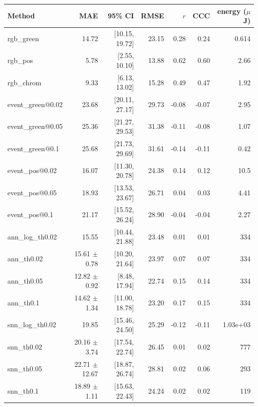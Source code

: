 \begin{tabular}{lrrrrrr}\toprule
Method & MAE & 95\% CI & RMSE & $r$ & CCC & energy ($\mu$J) \\\midrule
rgb\_green & 14.72 & [10.15, 19.72] & 23.15 & 0.28 & 0.24 & 0.614 \\
rgb\_pos & 5.78 & [2.55, 10.10] & 13.88 & 0.62 & 0.60 & 2.66 \\
rgb\_chrom & 9.33 & [6.13, 13.02] & 15.28 & 0.49 & 0.47 & 1.92 \\
event\_green@0.02 & 23.68 & [20.11, 27.17] & 29.73 & -0.08 & -0.07 & 2.95 \\
event\_green@0.05 & 25.36 & [21.27, 29.53] & 31.38 & -0.11 & -0.08 & 1.07 \\
event\_green@0.1 & 25.68 & [21.73, 29.69] & 31.61 & -0.14 & -0.11 & 0.42 \\
event\_pos@0.02 & 16.07 & [11.30, 20.78] & 24.38 & 0.14 & 0.12 & 10.5 \\
event\_pos@0.05 & 18.93 & [13.53, 23.67] & 26.71 & 0.04 & 0.03 & 4.41 \\
event\_pos@0.1 & 21.17 & [15.52, 26.24] & 28.90 & -0.04 & -0.04 & 2.27 \\
ann\_log\_th0.02 & 15.55 & [10.44, 21.88] & 23.48 & 0.01 & 0.01 & 334 \\
ann\_th0.02 & 15.61 $\pm$0.78 & [10.20, 21.64] & 23.97 & 0.07 & 0.07 & 334 \\
ann\_th0.05 & 12.82 $\pm$0.92 & [8.48, 17.94] & 22.74 & 0.15 & 0.14 & 334 \\
ann\_th0.1 & 14.62 $\pm$1.34 & [11.00, 18.78] & 23.20 & 0.17 & 0.15 & 334 \\
snn\_log\_th0.02 & 19.85 & [15.46, 24.50] & 25.29 & -0.12 & -0.11 & 1.03e+03 \\
snn\_th0.02 & 20.16 $\pm$3.74 & [17.54, 22.74] & 26.45 & 0.01 & 0.02 & 777 \\
snn\_th0.05 & 22.71 $\pm$12.67 & [18.87, 26.74] & 28.81 & 0.02 & 0.06 & 293 \\
snn\_th0.1 & 18.89 $\pm$1.11 & [15.63, 22.43] & 24.24 & 0.02 & 0.02 & 119 \\
\bottomrule\end{tabular}
